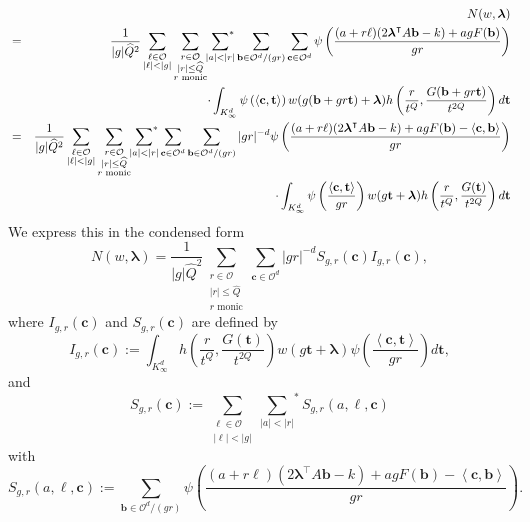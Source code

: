\documentclass[10pt]{amsart}
\theoremstyle{plain}
\theoremstyle{plain}
\renewcommand{\vec}[1]{\mathbf{#1}}
\theoremstyle{remark}
\theoremstyle{definition}
\renewcommand{\hat}{\widehat}
\newcommand{\Ki}{K_\infty}
\newcommand{\hQ}{\widehat{Q}}
\newcommand{\sumstar}{\sideset{}{^*}\sum}
\newcommand{\cO}{\mathcal{O}}
\begin{document}
\begin{eqnarray*}\label{form13}
&&N(w,\boldsymbol{\lambda})\\ &=&\frac{1}{|g|\hQ^2}\sum_{\substack{\ell\in \cO\\ |\ell|<|g|}}
\sum_{\substack{
r\in \cO\\
|r|\leq \hat Q\\
\text{$r$ monic}
} }
\sumstar_{\substack{
|a|<|r|} }\sum_{\vec{b}\in\mathcal{O}^d/(gr)}\sum_{\vec{c}\in\mathcal{O}^d}\psi\left(\frac{(a+r\ell)(2\boldsymbol{\lambda}^{\intercal} A\vec{b}-k)+agF(\vec{b})}{gr}\right)\\&&\cdot\int_{\Ki^d}\psi\left(\left<\vec{c},\vec{t}\right>\right)w(g(\vec{b}+gr\vec{t})+\boldsymbol{\lambda})h\left(\frac{r}{t^Q},\frac{G(\vec{b}+gr\vec{t})}{t^{2Q}}\right)d\vec{t}\\ &=& \frac{1}{|g|\hQ^2}\sum_{\substack{\ell\in \cO\\ |\ell|<|g|}}
\sum_{\substack{
r\in \cO\\
|r|\leq \hat Q\\
\text{$r$ monic}
} }
\sumstar_{\substack{
|a|<|r|} }\sum_{\vec{c}\in\mathcal{O}^d}\sum_{\vec{b}\in\mathcal{O}^d/(gr)}|gr|^{-d}\psi\left(\frac{(a+r\ell)(2\boldsymbol{\lambda}^{\intercal} A\vec{b}-k)+agF(\vec{b})-\left<\vec{c},\vec{b}\right>}{gr}\right)\\&&\cdot\int_{\Ki^d}\psi\left(\frac{\left<\vec{c},\vec{t}\right>}{gr}\right)w(g\vec{t}+\boldsymbol{\lambda})h\left(\frac{r}{t^Q},\frac{G(\vec{t})}{t^{2Q}}\right)d\vec{t}
\end{eqnarray*}
We express this in the condensed form
\begin{equation}\label{newequu}N(w,\boldsymbol{\lambda})=\frac{1}{|g|\hQ^2}\sum_{\substack{
r\in \cO\\
|r|\leq \hat Q\\
\text{$r$ monic}
} }\sum_{\vec{c}\in\mathcal{O}^d}|gr|^{-d}S_{g,r}(\vec{c})I_{g,r}(\vec{c}),\end{equation}
where $I_{g,r}(\vec{c})$ and $S_{g,r}(\vec{c})$ are defined by 
\begin{equation}\label{intt}
I_{g,r}(\vec{c}):= \int_{\Ki^d} h\left(\frac{r}{t^Q},\frac{G(\vec{t})}{t^{2Q}}\right) w(g\vec{t}+\boldsymbol{\lambda}) \psi\left(\frac{\left< \vec{c},\vec{t} \right>}{gr}    \right) d\vec{t},
\end{equation}
and
\begin{equation}\label{sala}S_{g,r}(\vec{c}):=\sum_{\substack{\ell\in \cO\\ |\ell|<|g|}}{\sum_{|a|<|r|}}^* S_{g,r}(a,\ell,\vec{c})\end{equation}
with
\begin{equation}\label{salam}
S_{g,r}(a,\ell,\vec{c}):=\sum_{\vec{b}\in \mathcal{O}^d/(gr)} \psi\left(\frac{(a+r\ell)(2\boldsymbol{\lambda}^{\intercal} A\vec{b}-k) + ag F(\vec{b})-\left< \vec{c},\vec{b} \right>} {gr}\right).
\end{equation}
\end{document}
